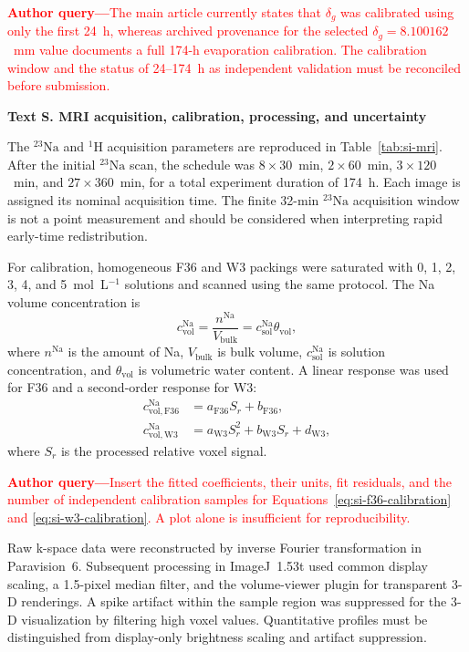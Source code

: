 \documentclass[draft,wrr]{agutexSI2019}
\newcounter{sitext}
\renewcommand{\thesitext}{S\arabic{sitext}}
\newcommand{\sitext}[1]{%
  \refstepcounter{sitext}%
  \par\medskip\noindent\textbf{Text \thesitext. #1}\par\medskip}
\newcommand{\verify}[1]{%
  \par\smallskip\noindent\textcolor{red}{\textbf{Author query---}#1}\par\smallskip}
\newcommand{\NaIso}{\(^{23}\mathrm{Na}\)}
\newcommand{\HIso}{\(^{1}\mathrm{H}\)}
\begin{document}
\begin{article}
\verify{The main article currently states that $\delta_g$ was calibrated using
only the first 24~h, whereas archived provenance for the selected
$\delta_g=8.100162$~mm value documents a full 174-h evaporation calibration.
The calibration window and the status of 24--174~h as independent validation
must be reconciled before submission.}

\sitext{MRI acquisition, calibration, processing, and uncertainty}
\label{app:mri}

The \NaIso{} and \HIso{} acquisition parameters are reproduced in
Table~\ref{tab:si-mri}. After the initial \NaIso{} scan, the schedule was
$8\times30$~min, $2\times60$~min, $3\times120$~min, and
$27\times360$~min, for a total experiment duration of 174~h. Each image is
assigned its nominal acquisition time. The finite 32-min \NaIso{} acquisition
window is not a point measurement and should be considered when interpreting
rapid early-time redistribution.

For calibration, homogeneous F36 and W3 packings were saturated with 0, 1, 2,
3, 4, and 5~mol~L$^{-1}$ solutions and scanned using the same protocol. The
Na volume concentration is
\begin{equation}
c_{\mathrm{vol}}^{\mathrm{Na}}
=\frac{n^{\mathrm{Na}}}{V_{\mathrm{bulk}}}
=c_{\mathrm{sol}}^{\mathrm{Na}}\theta_{\mathrm{vol}},
\label{eq:si-mri-calibration}
\end{equation}
where $n^{\mathrm{Na}}$ is the amount of Na, $V_{\mathrm{bulk}}$ is bulk
volume, $c_{\mathrm{sol}}^{\mathrm{Na}}$ is solution concentration, and
$\theta_{\mathrm{vol}}$ is volumetric water content. A linear response was used
for F36 and a second-order response for W3:
\begin{align}
c_{\mathrm{vol,F36}}^{\mathrm{Na}} &=
a_{\mathrm{F36}}S_r+b_{\mathrm{F36}},
\label{eq:si-f36-calibration}\\
c_{\mathrm{vol,W3}}^{\mathrm{Na}} &=
a_{\mathrm{W3}}S_r^2+b_{\mathrm{W3}}S_r+d_{\mathrm{W3}},
\label{eq:si-w3-calibration}
\end{align}
where $S_r$ is the processed relative voxel signal.

\verify{Insert the fitted coefficients, their units, fit residuals, and the
number of independent calibration samples for
Equations~\ref{eq:si-f36-calibration} and \ref{eq:si-w3-calibration}. A plot
alone is insufficient for reproducibility.}

Raw k-space data were reconstructed by inverse Fourier transformation in
Paravision~6. Subsequent processing in ImageJ~1.53t used common display scaling,
a 1.5-pixel median filter, and the volume-viewer plugin for transparent 3-D
renderings. A spike artifact within the sample region was suppressed for the
3-D visualization by filtering high voxel values. Quantitative profiles must be
distinguished from display-only brightness scaling and artifact suppression.


\end{article}
\end{document}
